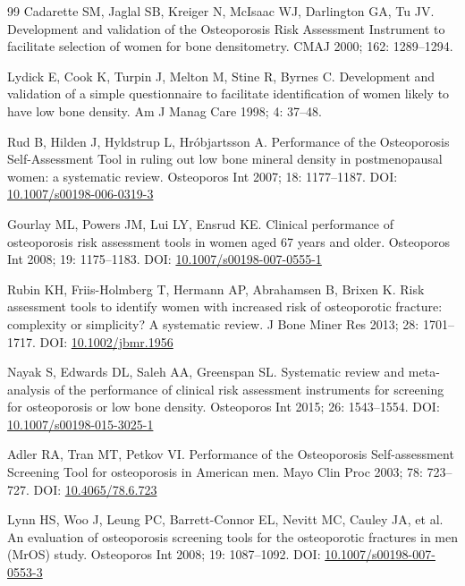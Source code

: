\documentclass[11pt,a4paper]{article}
\begin{document}
\begin{thebibliography}{99}
 Cadarette SM, Jaglal SB, Kreiger N, McIsaac WJ, Darlington GA, Tu JV. Development and validation of the Osteoporosis Risk Assessment Instrument to facilitate selection of women for bone densitometry. CMAJ 2000; 162: 1289--1294.

 Lydick E, Cook K, Turpin J, Melton M, Stine R, Byrnes C. Development and validation of a simple questionnaire to facilitate identification of women likely to have low bone density. Am J Manag Care 1998; 4: 37--48.

 Rud B, Hilden J, Hyldstrup L, Hr\'{o}bjartsson A. Performance of the Osteoporosis Self-Assessment Tool in ruling out low bone mineral density in postmenopausal women: a systematic review. Osteoporos Int 2007; 18: 1177--1187. DOI: \href{https://doi.org/10.1007/s00198-006-0319-3}{10.1007/s00198-006-0319-3}

 Gourlay ML, Powers JM, Lui LY, Ensrud KE. Clinical performance of osteoporosis risk assessment tools in women aged 67 years and older. Osteoporos Int 2008; 19: 1175--1183. DOI: \href{https://doi.org/10.1007/s00198-007-0555-1}{10.1007/s00198-007-0555-1}

 Rubin KH, Friis-Holmberg T, Hermann AP, Abrahamsen B, Brixen K. Risk assessment tools to identify women with increased risk of osteoporotic fracture: complexity or simplicity? A systematic review. J Bone Miner Res 2013; 28: 1701--1717. DOI: \href{https://doi.org/10.1002/jbmr.1956}{10.1002/jbmr.1956}

 Nayak S, Edwards DL, Saleh AA, Greenspan SL. Systematic review and meta-analysis of the performance of clinical risk assessment instruments for screening for osteoporosis or low bone density. Osteoporos Int 2015; 26: 1543--1554. DOI: \href{https://doi.org/10.1007/s00198-015-3025-1}{10.1007/s00198-015-3025-1}

 Adler RA, Tran MT, Petkov VI. Performance of the Osteoporosis Self-assessment Screening Tool for osteoporosis in American men. Mayo Clin Proc 2003; 78: 723--727. DOI: \href{https://doi.org/10.4065/78.6.723}{10.4065/78.6.723}

 Lynn HS, Woo J, Leung PC, Barrett-Connor EL, Nevitt MC, Cauley JA, et al. An evaluation of osteoporosis screening tools for the osteoporotic fractures in men (MrOS) study. Osteoporos Int 2008; 19: 1087--1092. DOI: \href{https://doi.org/10.1007/s00198-007-0553-3}{10.1007/s00198-007-0553-3}


\end{thebibliography}
\end{document}
